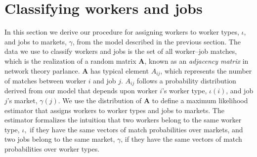 \documentclass[12pt]{article}
\def\g{\gamma}
\def\i{\iota}
\theoremstyle{definition}
\theoremstyle{plain}
\begin{document}




\section{Classifying workers and jobs}


In this section we derive our procedure for assigning workers to worker types, $\i$, and jobs to markets, $\g$, from the model described in the previous section. The data we use to classify workers and jobs is the set of all worker--job matches, which is the realization of a random matrix $\mathbf{A}$, known as an \emph{adjacency matrix} in network theory parlance. $\mathbf{A}$ has typical element $A_{ij}$, which represents the number of matches  between worker $i$ and job $j$. $A_{ij}$ follows a probability distribution derived from our model that depends upon worker $i$'s worker type, $\i(i)$, and job $j$'s market, $\g(j)$. We use the distribution of $\mathbf{A}$ to define a maximum likelihood estimator that assigns workers to worker types and jobs to markets. The estimator formalizes the intuition that two workers belong to the same worker type, $\i,$ if they have the same vectors of match probabilities over markets, and two jobs belong to the same market, $\g$, if they have the same vectors of match probabilities over worker types.
\end{document}
